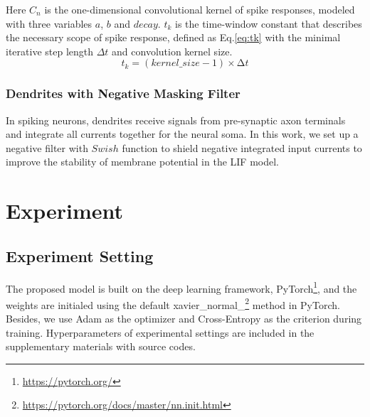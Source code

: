 \documentclass{article}
\begin{document}
Here $C_n$ is the one-dimensional convolutional kernel of spike responses, modeled with three variables $a$, $b$ and $decay$. $t_k$ is the time-window constant that describes the necessary scope of spike response, defined as Eq.\ref{eq:tk} with the minimal iterative step length $\Delta t$ and convolution kernel size. 
\begin{equation}
    t_{k} = (kernel\_size - 1) \times \mathrm{\Delta}t
    \label{eq:tk}
\end{equation}

























\subsubsection{Dendrites with Negative Masking Filter}

In spiking neurons, dendrites receive signals from pre-synaptic axon terminals and integrate all currents together for the neural soma. In this work, we set up a negative filter with $Swish$ function \cite{ramachandran_searching_2018} to shield negative integrated input currents to improve the stability of membrane potential in the LIF model.














\section{Experiment}

\subsection{Experiment Setting}


The proposed model is built on the deep learning framework, PyTorch\footnote{\url{https://pytorch.org/}}, and the weights are initialed using the default xavier\_normal\_\footnote{\url{https://pytorch.org/docs/master/nn.init.html}} method in PyTorch. Besides, we use Adam as the optimizer and Cross-Entropy as the criterion during training. Hyperparameters of experimental settings are included in the supplementary materials with source codes.
\end{document}
